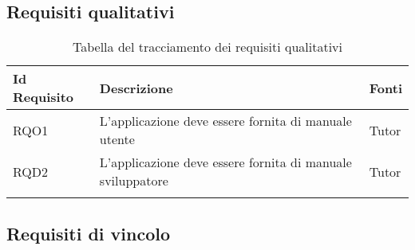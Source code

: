 \newpage

\subsection{Requisiti qualitativi}

{\renewcommand{\arraystretch}{2}
\begin{center}
\begin{longtable}{ | >{\centering\arraybackslash}p{2.5cm} | >{\arraybackslash}p{7cm} | >{\centering\arraybackslash}p{2cm} | }
\hline
\textbf{Id Requisito} & \textbf{Descrizione} & \textbf{Fonti} \\ \hline
\endhead
RQO1 & L'applicazione deve essere fornita di manuale utente & Tutor \\ \hline
RQD2 & L'applicazione deve essere fornita di manuale sviluppatore & Tutor \\ \hline
\caption{Tabella del tracciamento dei requisiti qualitativi}
\end{longtable}
\end{center}}

\newpage

\subsection{Requisiti di vincolo}


